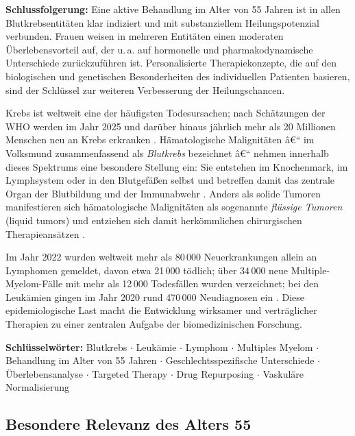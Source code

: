 ﻿\documentclass[12pt,a4paper]{article}
\theoremstyle{definition}
\begin{document}
\noindent
\textbf{Schlussfolgerung:} Eine aktive Behandlung im Alter von 55 Jahren ist in allen
Blutkrebsentitäten klar indiziert und mit substanziellem Heilungspotenzial verbunden.
Frauen weisen in mehreren Entitäten einen moderaten Überlebensvorteil auf, der u.\,a.
auf hormonelle und pharmakodynamische Unterschiede zurückzuführen ist. Personalisierte
Therapiekonzepte, die auf den biologischen und genetischen Besonderheiten des
individuellen Patienten basieren, sind der Schlüssel zur weiteren Verbesserung der
Heilungschancen.

Krebs ist weltweit eine der häufigsten Todesursachen; nach Schätzungen der WHO werden
im Jahr 2025 und darüber hinaus jährlich mehr als 20 Millionen Menschen neu an Krebs
erkranken \cite{bray2018}. Hämatologische Malignitäten â€“ im Volksmund zusammenfassend
als \emph{Blutkrebs} bezeichnet â€“ nehmen innerhalb dieses Spektrums eine besondere
Stellung ein: Sie entstehen im Knochenmark, im Lymphsystem oder in den Blutgefäßen
selbst und betreffen damit das zentrale Organ der Blutbildung und der Immunabwehr
\cite{adeyemi2025}. Anders als solide Tumoren manifestieren sich hämatologische
Malignitäten als sogenannte \emph{flüssige Tumoren} (liquid tumors) und entziehen sich
damit herkömmlichen chirurgischen Therapieansätzen \cite{swerdlow2016}.

Im Jahr 2022 wurden weltweit mehr als 80\,000 Neuerkrankungen allein an Lymphomen
gemeldet, davon etwa 21\,000 tödlich; über 34\,000 neue Multiple-Myelom-Fälle mit mehr
als 12\,000 Todesfällen wurden verzeichnet; bei den Leukämien gingen im Jahr 2020
rund 470\,000 Neudiagnosen ein \cite{adeyemi2025,siegel2023}. Diese epidemiologische
Last macht die Entwicklung wirksamer und verträglicher Therapien zu einer zentralen
Aufgabe der biomedizinischen Forschung.

\textbf{Schlüsselwörter:} Blutkrebs $\cdot$ Leukämie $\cdot$ Lymphom $\cdot$ Multiples Myelom
$\cdot$ Behandlung im Alter von 55 Jahren $\cdot$ Geschlechtsspezifische Unterschiede
$\cdot$ Überlebensanalyse $\cdot$ Targeted Therapy $\cdot$ Drug Repurposing
$\cdot$ Vaskuläre Normalisierung


\subsection{Besondere Relevanz des Alters 55}
\end{document}
